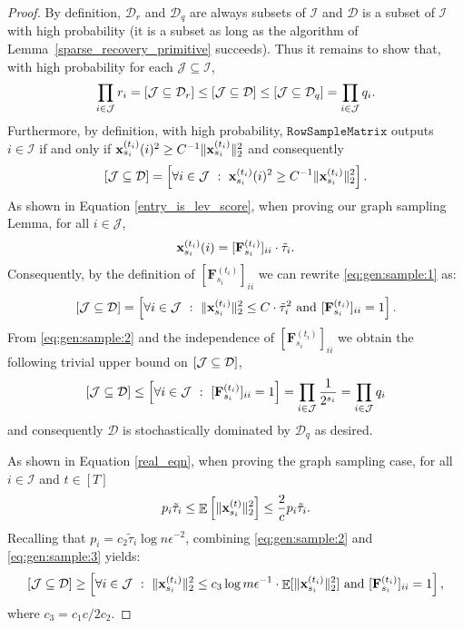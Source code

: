 \documentclass[11pt]{article}
\DeclareMathOperator*{\E}{\mathbb{E}}
\let\Pr\relax
\DeclareMathOperator*{\Pr}{\mathbb{P}}
\newcommand{\norm}[1]{\|#1\|}
\newcommand{\bv}[1]{\mathbf{#1}}
\newcommand{\sample}{\texttt{RowSampleMatrix}}
\newcommand{\dist}{\mathcal{D}}
\begin{document}
\begin{proof}
By definition, $\dist_r$ and $\dist_q$ are always subsets of $\mathcal{I}$ and $\dist$ is a subset of $\mathcal{I}$ with high probability (it is a subset as long as the algorithm of Lemma~\ref{sparse_recovery_primitive} succeeds). Thus it remains to show that, with high probability for each  $\mathcal{J} \subseteq \mathcal{I}$,
\[
\prod_{i \in \mathcal{J}} r_i
= \Pr[\mathcal{J} \subseteq \dist_r]
\leq \Pr[\mathcal{J} \subseteq \dist]
\leq \Pr[\mathcal{J} \subseteq \dist_q]
= \prod_{i \in \mathcal{J}} q_i
.
\]
    Furthermore, by definition, with high probability, $\sample$ outputs $i\in \mathcal{I}$ if and only if $\xsiti(i)^2 \geq C^{-1} \norm{\vxsiti}_2^2$ and consequently
\begin{equation}
\label{eq:gen:sample:1}
\Pr[\mathcal{J} \subseteq \dist]
= \Pr\left[\forall i \in \mathcal{J} ~ : ~ 
\xsiti(i)^2 \geq C^{-1} \norm{\vxsiti}_2^2
\right].
\end{equation}
As shown in Equation \ref{entry_is_lev_score}, when proving our graph sampling Lemma, for all $i \in \mathcal{J}$,
\[
\xsiti(i)
=  [\bv{F}_{s_i}^{(t_i)}]_{ii} \cdot \tilde{\tau}_i .
\]
Consequently, by the definition of $[\bv{F}_{s_i}^{(t_i)}]_{ii}$ we can rewrite \eqref{eq:gen:sample:1} as:
\begin{equation}
\label{eq:gen:sample:2}
\Pr[\mathcal{J} \subseteq \dist]
= \Pr\left[\forall i \in \mathcal{J} ~ : ~
\norm{\vxsiti}_2^2 \leq C \cdot \tilde{\tau}_i^2
~ \text{and} ~
[\bv{F}_{s_i}^{(t_i)}]_{ii} = 1
\right].
\end{equation}
From \eqref{eq:gen:sample:2} and the independence of $[\bv{F}_{s_i}^{(t_i)}]_{ii}$ we obtain the following trivial upper bound on $\Pr[\mathcal{J} \subseteq \dist]$,
\[
\Pr[\mathcal{J} \subseteq \dist]
\leq
\Pr\left[\forall i \in \mathcal{J} ~ : ~ [\bv{F}_{s_i}^{(t_i)}]_{ii} = 1\right]
= \prod_{i \in \mathcal{J}} \frac{1}{2^{s_i}}
= \prod_{i \in \mathcal{J}} q_i
\]
and consequently $\dist$ is stochastically dominated by $\dist_q$ as desired.

As shown in Equation \ref{real_eqn}, when proving the graph sampling case, for all $i \in \mathcal{I}$ and $t \in [T]$
\begin{equation}
\label{eq:gen:sample:3}
p_i \tilde \tau_i \leq \E\left[\norm{\vxsit}_2^2\right]
\leq 
\frac{2}{c} p_i \tilde \tau_i .
\end{equation}
Recalling that $p_i =  c_2\tilde \tau_i \log n \epsilon^{-2}$, combining \eqref{eq:gen:sample:2} and \eqref{eq:gen:sample:3} yields:
\begin{equation}
\label{eq:gen:sample:4}
\Pr[\mathcal{J} \subseteq \dist]
\geq \Pr\left[\forall i \in \mathcal{J} ~ : ~
\norm{\vxsiti}_2^2 \leq c_3 \log m \epsilon^{-1} \cdot \E[\norm{\vxsiti}_2^2]
\text{ and }
[\bv{F}_{s_i}^{(t_i)}]_{ii} = 1
\right],
\end{equation}
where $c_3 = c_1c /2c_2$.


\end{proof}
\end{document}
